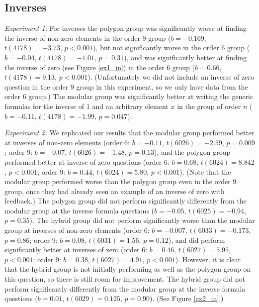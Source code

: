 \documentclass[man,mask,10pt]{apa6}
\begin{document}
\subsection{Inverses}
\textit{Experiment 1:} For inverses the polygon group was significantly worse at finding the inverse of non-zero elements in the order 9 group ($b = -0.169$, $t(4178)=-3.73$, $p < 0.001$), but not significantly worse in the order 6 group ($b = -0.04$, $t(4178)=-1.01$, $p =0.31$), and was significantly better at finding the inverse of zero (see Figure \ref{ex1_in}) in the order 6 group ($b = 0.66$, $t(4178)=9.13$, $p < 0.001$). (Unfortunately we did not include an inverse of zero question in the order 9 group in this experiment, so we only have data from the order 6 group.) The modular group was significantly better at writing the generic formulas for the inverse of 1 and an arbitrary element $x$ in the group of order $n$ ($b = -0.11$, $t(4178)=-1.99$, $p = 0.047$). \par
\textit{Experiment 2:}  We replicated our results that the modular group performed better at inverses of non-zero elements (order 6: $b = -0.11$, $t(6026) = -2.59$, $p = 0.009$; order 9: $b = -0.07$, $t(6026) = -1.48$, $p = 0.13$), and the polygon group performed better at inverse of zero questions (order 6: $b = 0.68$, $t(6024) = 8.842$, $p < 0.001$; order 9: $b = 0.44$, $t(6024) = 5.80$, $p < 0.001$). (Note that the modular group performed worse than the polygon group even in the order 9 group, once they had already seen an example of an inverse of zero with feedback.) The polygon group did not perform significantly differently from the modular group at the inverse formula questions ($b = -0.05$, $t(6025)=-0.94$, $p = 0.35$). The hybrid group did not perform significantly worse than the modular group at inverses of non-zero elements (order 6: $b = -0.007$, $t(6033) = -0.173$, $p = 0.86$; order 9: $b = 0.08$, $t(6031) = 1.56$, $p = 0.12$), and did perform significantly better at inverses of zero (order 6: $b = 0.46$, $t(6027) = 5.95$, $p < 0.001$; order 9: $b = 0.38$, $t(6027) = 4.91$, $p < 0.001$). However, it is clear that the hybrid group is not initially performing as well as the polygon group on this question, so there is still room for improvement. The hybrid group did not perform significantly differently from the modular group at the inverse formula questions ($b = 0.01$, $t(6029)=0.125$, $p =0.90$). (See Figure \ref{ex2_in}.) \par 
\end{document}
